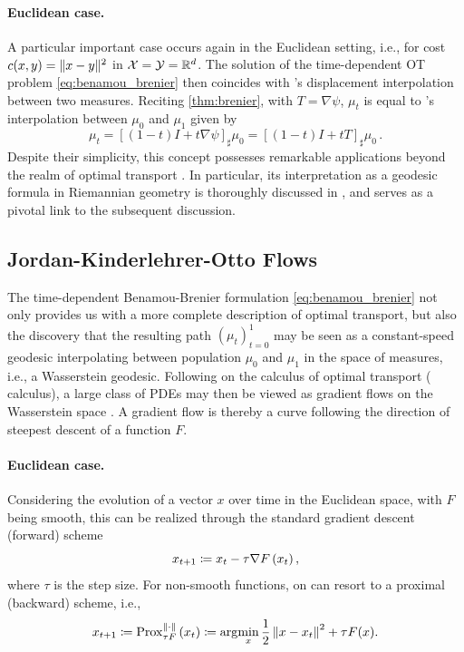 \paragraph{Euclidean case.} A particular important case occurs again in the Euclidean setting, i.e., for cost $c(x, y) = \lVert x-y\rVert^2$ in ${\mathcal{X}} = {\mathcal{Y}} = \mathbb{R}^d$. The solution of the time-dependent OT problem \eqref{eq:benamou_brenier} then coincides with \citeauthor{mccann1997convexity}'s displacement interpolation between two measures.
Reciting \cref{thm:brenier}, with $T = \nabla \psi$, $\mu_t$ is equal to \citeauthor{mccann1997convexity}'s interpolation between $\mu_0$ and $\mu_1$ given by
\begin{equation} \label{eq:mccann_interpolation}
	\mu_t = [(1-t) I+t \nabla \psi]_\sharp \mu_0 = [(1-t) I+t T]_\sharp \mu_0\,.
\end{equation}
Despite their simplicity, this concept possesses remarkable applications beyond the realm of optimal transport \citep{bonneel2011displacement}. In particular, its interpretation as a geodesic formula in Riemannian geometry is thoroughly discussed in \citet{gangbo1996geometry}, and serves as a pivotal link to the subsequent discussion.


\subsection{Jordan-Kinderlehrer-Otto Flows} \label{sec:background_jko}

The time-dependent Benamou-Brenier formulation \eqref{eq:benamou_brenier} not only provides us with a more complete description of optimal transport, but also the discovery that the resulting path $(\mu_t)_{t=0}^1$ may be seen as a constant-speed geodesic interpolating between population $\mu_0$ and $\mu_1$ in the space of measures, i.e., a Wasserstein geodesic.
Following \citet{otto2001geometry} on the calculus of optimal transport (\citeauthor{otto2001geometry} calculus), a large class of PDEs may then be viewed as gradient flows on the Wasserstein space \citep{jordan1998variational}.
A gradient flow is thereby a curve following the direction of steepest descent of a function $F$.

\paragraph{Euclidean case.} Considering the evolution of a vector $x$ over time in the Euclidean space, with $F$ being smooth, this can be realized through the standard gradient descent (forward) scheme
\begin{equation*}
	x_{t+1} \coloneqq x_{t}-\tau \nabla F\left(x_{t}\right),
\end{equation*}
where $\tau$ is the step size. For non-smooth functions, on can resort to a proximal (backward) scheme, i.e.,
\begin{equation*}
	x_{t+1} \coloneqq \operatorname{Prox}_{\tau F}^{\|\cdot\|}\left(x_{t}\right) \coloneqq \arg\!\min_x \frac{1}{2}\left\| x-x_t\right\|^2+\tau F(x).
\end{equation*}


